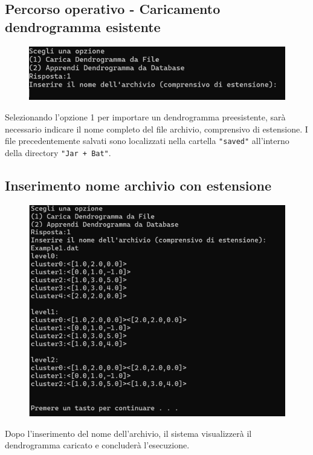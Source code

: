 \subsection{Percorso operativo - Caricamento dendrogramma esistente}
\begin{figure}[h!]
    \centering
    \includegraphics[width=\textwidth]{images/carica_dendrogramma_file.png}
\end{figure}

Selezionando l'opzione 1 per importare un dendrogramma preesistente, sarà necessario indicare il nome completo del file archivio, comprensivo di estensione. I file precedentemente salvati sono localizzati nella cartella \texttt{"saved"} all'interno della directory \texttt{"Jar + Bat"}.

\subsection{Inserimento nome archivio con estensione}

\begin{figure}[h!]
    \centering
    \includegraphics[width=\textwidth]{images/inserimento_nome_archivio.png}
\end{figure}

Dopo l'inserimento del nome dell'archivio, il sistema visualizzerà il dendrogramma caricato e concluderà l'esecuzione.
